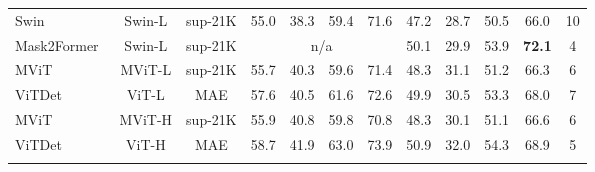 \begin{table}[t]
{{\begin{tabular}{lccccccccccc}
    \multicolumn{1}{l|}{{Swin~\cite{liu2021swintransformer}}} & {Swin-L} & \multicolumn{1}{c|}{sup-21K} & {55.0} & {38.3} & {59.4} & \multicolumn{1}{c|}{{71.6}} & {47.2} & {28.7} & {50.5} & \multicolumn{1}{c|}{{66.0}} & {10} \\
    \multicolumn{1}{l|}{Mask2Former~\cite{cheng2022mask2former}} & {Swin-L} & \multicolumn{1}{c|}{sup-21K} & \multicolumn{4}{c|}{\small n/a} & 50.1 & 29.9 & 53.9 & \multicolumn{1}{c|}{\textbf{72.1}} & 4 \\
    \multicolumn{1}{l|}{{MViT~\cite{fan2021mvit}}} & {MViT-L} & \multicolumn{1}{c|}{sup-21K} & {55.7} & {40.3} & {59.6} & \multicolumn{1}{c|}{{71.4}} & {48.3} & {31.1} & {51.2} & \multicolumn{1}{c|}{{66.3}} & {6} \\
    \multicolumn{1}{l|}{{ViTDet~\cite{li2022vitdet}}} & {ViT-L} & \multicolumn{1}{c|}{MAE} & {57.6} & {40.5} & {61.6} & \multicolumn{1}{c|}{{72.6}} & {49.9} & {30.5} & {53.3} & \multicolumn{1}{c|}{{68.0}} & {7} \\
    \hline
    \multicolumn{1}{l|}{{MViT~\cite{li2022vitdet}}} & {MViT-H} & \multicolumn{1}{c|}{sup-21K} & {55.9} & {40.8} & {59.8} & \multicolumn{1}{c|}{{70.8}} & {48.3} & {30.1} & {51.1} & \multicolumn{1}{c|}{{66.6}} & {6} \\
    \multicolumn{1}{l|}{{ViTDet~\cite{li2022vitdet}}} & {ViT-H} & \multicolumn{1}{c|}{MAE} & {58.7} & {41.9} & {63.0} & \multicolumn{1}{c|}{{73.9}} & {50.9} & {32.0} & {54.3} & \multicolumn{1}{c|}{{68.9}} & {5} \\
    \shline
    \rowcolor{orange!50} \multicolumn{12}{l}{\footnotesize \textbf{Plain features}} \\

\end{tabular}}}
\end{table}
